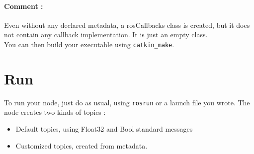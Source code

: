 \paragraph{Comment : }Even without any declared \ros metadata, a rosCallbacks class is created, but it does not contain any callback implementation. It is just an empty class.\\

You can then build your executable using \lstinline'catkin_make'.

\section{Run}
To run your node, just do as usual, using \lstinline'rosrun' or a launch file you wrote. The \faust node creates two kinds of topics :
\begin{itemize}
	\item Default topics, using Float32 and Bool standard messages
	\item Customized topics, created from \ros metadata.
\end{itemize}